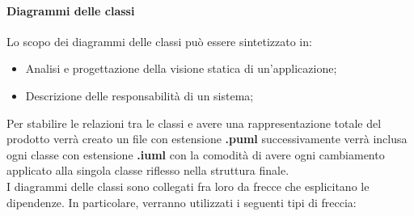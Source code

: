 	    \paragraph{Diagrammi delle classi}
	    Lo scopo dei diagrammi delle classi può essere sintetizzato in:
	    \begin{itemize}
	        \item Analisi e progettazione della visione statica di un’applicazione;
             \item Descrizione delle responsabilità di un sistema;
	    \end{itemize}
	    Per stabilire le relazioni tra le classi e avere una rappresentazione totale del prodotto verrà creato un file con estensione \textbf{.puml} successivamente verrà inclusa ogni classe con estensione \textbf{.iuml} con la comodità di avere ogni cambiamento applicato alla singola classe riflesso nella struttura finale.\\
	    I diagrammi delle classi sono collegati fra loro da frecce che esplicitano le dipendenze. In particolare, verranno utilizzati i seguenti tipi di freccia:
